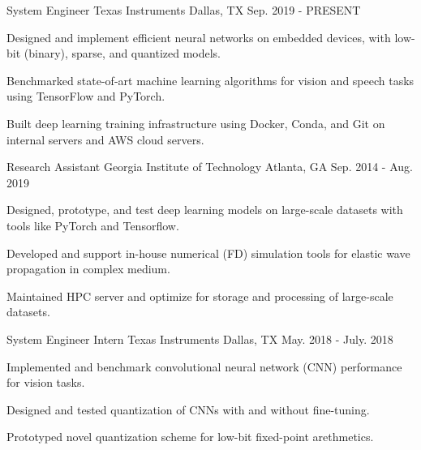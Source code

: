 

\begin{cventries}

\cventry
{System Engineer} %
{Texas Instruments} %
{Dallas, TX} %
{Sep. 2019 - PRESENT} %
{
		\begin{cvitems} %
			\item {Designed and implement efficient neural networks on embedded devices, with low-bit (binary), sparse, and quantized models.}
			\item {Benchmarked state-of-art machine learning algorithms for vision and speech tasks using TensorFlow and PyTorch.}
			\item {Built deep learning training infrastructure using Docker, Conda, and Git on internal servers and AWS cloud servers.}
		\end{cvitems}
}

	\cventry
		{Research Assistant} %
		{Georgia Institute of Technology} %
		{Atlanta, GA} %
		{Sep. 2014 - Aug. 2019} %
		{
			\begin{cvitems} %
				\item {Designed, prototype, and test deep learning models on large-scale datasets with tools like PyTorch and Tensorflow.}
				\item {Developed and support in-house numerical (FD) simulation tools for elastic wave propagation in complex medium.}
				\item {Maintained HPC server and optimize for storage and processing of large-scale datasets.}
			\end{cvitems}
		}

\cventry
{System Engineer Intern} %
{Texas Instruments} %
{Dallas, TX} %
{May. 2018 - July. 2018} %
{
		\begin{cvitems} %
				\item {Implemented and benchmark convolutional neural network (CNN) performance for vision tasks.}
				\item {Designed and tested quantization of CNNs with and without fine-tuning.}
				\item {Prototyped novel quantization scheme for low-bit fixed-point arethmetics.}
		\end{cvitems}
}


\end{cventries}
